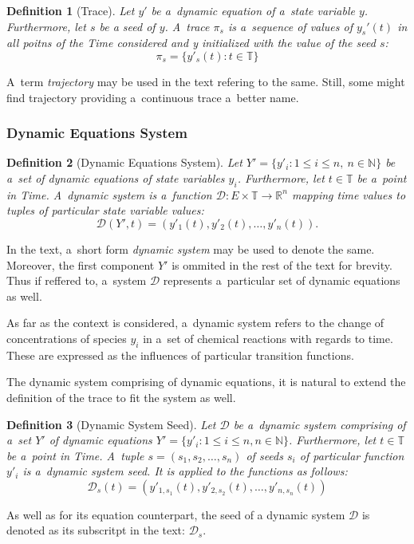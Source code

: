 \documentclass[12pt,oneside,draft]{fithesis}
\newcommand{\mD}{\mathcal{D}}
\newcommand{\mReal}{\mathbb{R}}
\newcommand{\mNatural}{\mathbb{N}}
\newcommand{\mTime}{\mathbb{T}}
\newtheorem{mydef}{Definition}
\begin{document}
\begin{mydef}[Trace]
Let $y'$ be a~dynamic equation of a~state variable $y$. Furthermore,
let $s$ be a seed of $y$.
A~trace $\pi_s$ is a~sequence of values of $y_s'(t)$ in all poitns
of the Time considered and y initialized with the value of the seed $s$:
	\begin{equation}
		\pi_s = \{y'_s(t) : t \in \mTime\}
	\end{equation}
\end{mydef}
A~term \emph{trajectory} may be used in the text refering to the same.
Still, some might find trajectory providing a~continuous trace a~better
name.

\subsubsection{Dynamic Equations System}
\begin{mydef}[Dynamic Equations System]
Let $Y'=\{y'_i:1\leq{}i\leq{}n,\:n\in\mNatural\}$ be a~set of dynamic
equations of state variables $y_i$.
Furthermore, let $t\in\mTime$ be a~point in Time.
A~dynamic system is a~function
$\mD:E\times\mTime\rightarrow\mReal^n$ mapping
time values to tuples of particular state variable values:
	\begin{equation}
		\mD(Y',t)=(y'_{1}(t),y'_{2}(t),\dotsc,y'_{n}(t)).
	\end{equation}
\end{mydef}
In the text, a~short form \emph{dynamic system} may be used to denote
the same. Moreover, the first component $Y'$ is ommited in
the rest of the text for brevity. Thus if reffered to, a~system $\mD$
represents a~particular set of dynamic equations as well.

As far as the context is considered, a~dynamic system refers
to the change of concentrations of species $y_i$ in a~set of chemical
reactions with regards to time. These are expressed as the influences
of particular transition functions.

The dynamic system comprising of dynamic equations, it is natural to
extend the definition of the trace to fit the system as well.

\begin{mydef}[Dynamic System Seed]
Let $\mD$ be a~dynamic system comprising of a~set $Y'$ of dynamic
equations $Y'=\{y'_i:1\leq{}i\leq{}n,n\in\mNatural\}$.
Furthermore, let $t\in\mTime$ be a~point in Time.
A~tuple $s=(s_1,s_2,\dotsc,s_n)$ of seeds $s_i$ of particular
function $y'_i$ is a~dynamic system seed. It is applied to the functions
as follows:
	\begin{equation}
		\mD_s{}(t)=(y'_{1,s_1}(t),y'_{2,s_2}(t),\dotsc{},y'_{n,s_n}(t))
	\end{equation}
\end{mydef}
As well as for its equation counterpart, the seed of a dynamic system
$\mD$ is denoted as its subscritpt in the text: $\mD_s$.
\end{document}
